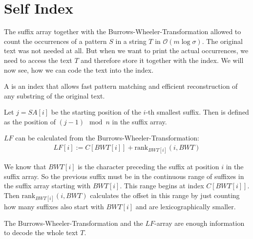 \section{Self Index}

The suffix array together with the Burrows-Wheeler-Transformation allowed to count the occurrences of a pattern $S$ in a string $T$ in $\mathcal{O}(m\log\sigma)$. The original text was not needed at all. But when we want to print the actual occurrences, we need to access the text $T$ and therefore store it together with the index. We will now see, how we can code the text into the index.

\begin{Definition}
  A  is an index that allows fast pattern matching and efficient reconstruction of any substring of the original text.
\end{Definition}

\begin{Definition}
  Let $j = SA[i]$ be the starting position of the $i$-th smallest suffix. Then  is defined as the position of $(j-1) \mod n$ in the suffix array.
\end{Definition}

\begin{Theorem}
  $LF$ can be calculated from the Burrows-Wheeler-Transformation:
  \begin{align}
    LF[i] := C[BWT[i]] + \mathrm{rank}_{BWT[i]}(i, BWT)
    \label{eq:lfMapping}
  \end{align}
\end{Theorem}

\begin{Proof}
  We know that $BWT[i]$ is the character preceding the suffix at position $i$ in the suffix array. So the previous suffix must be in the continuous range of suffixes in the suffix array starting with $BWT[i]$. This range begins at index $C[BWT[i]]$. Then $\mathrm{rank}_{BWT[i]}(i, BWT)$ calculates the offset in this range by just counting how many suffixes also start with $BWT[i]$ and are lexicographically smaller.
\end{Proof}

\begin{Theorem}
  \label{thm:lfMapping}
  The Burrows-Wheeler-Transformation and the $LF$-array are enough information to decode the whole text $T$.
\end{Theorem}

